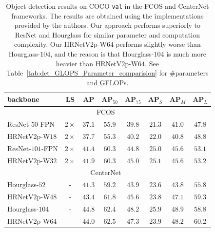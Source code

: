 \documentclass[10pt,journal,compsoc]{IEEEtran}
\begin{document}
\renewcommand{\arraystretch}{1.1}
	\begin{table}[t]
	\setlength{\tabcolsep}{4.4pt}
	\scriptsize
	\centering
	\caption{Object detection results on COCO \texttt{val}
	in the FCOS and CenterNet frameworks. 
	The results are obtained using
	the implementations provided by the authors.
	{
	Our approach performs superiorly to ResNet and Hourglass
	for similar parameter and computation complexity.
	Our HRNetV$2$p-W$64$
	performs slightly worse than Hourglass-$104$,
	and
	the reason is that 
	Hourglass-$104$ is much more heavier than
	HRNetV$2$p-W$64$.}
	See Table~\ref{tab:det_GLOPS_Parameter_comparision}
	for \#parameters and GFLOPs.}
	\label{tab:object_detection_anchorfree}
	\vspace{-.3cm}
	\begin{tabular}{l|c|ccc|ccc}
		\hline %
		backbone & LS & AP & AP$_{50}$ & AP$_{75}$ & AP$_S$ & AP$_M$ & AP$_L$\\
		\hline 
		\multicolumn{8}{c}{FCOS~\cite{TianSCH19}}\\
		\hline
		ResNet-$50$-FPN  & $2\times$  & $37.1$ & ${55.9}$ & $39.8$ & $21.3$ & ${41.0}$ & $47.8$ \\
		HRNetV$2$p-W$18$ & $2\times$  & ${37.7}$ & $55.3$ & ${40.2}$ & ${22.0}$ & $40.8$ & ${48.8}$ \\
		\hline
		ResNet-$101$-FPN & $2\times$  & $41.4$ & ${60.3}$ & $44.8$ & $25.0$ & ${45.6}$ & $53.1$ \\
		HRNetV$2$p-W$32$ & $2\times$  & ${41.9}$ & ${60.3}$ & ${45.0}$ & ${25.1}$ & ${45.6}$ & ${53.2}$ \\
		
	    \hline

	    \multicolumn{8}{c}{CenterNet~\cite{DuanBXQHT19}}\\
	    \hline
		Hourglass-$52$ & -  & $41.3$ & $59.2$ & $43.9$ & $23.6$ & $43.8$ & $55.8$ \\
		HRNetV$2$p-W$48$ & -  & ${43.4}$ & ${61.8}$ & ${45.6}$ & ${23.8}$ &${47.1}$ & ${59.3}$ \\
		\hline
		Hourglass-$104$ & -  & ${44.8}$ & $62.4$ & ${48.2}$ & ${25.9}$ & ${48.9}$ & $58.8$ \\
		HRNetV$2$p-W$64$ & -  & $44.0$ & ${62.5}$ & $47.3$ & $23.9$ &$48.2$ & ${60.2}$ \\
		\hline
	\end{tabular} 
	\vspace{-.2cm}
	\end{table}
	
\end{document}
